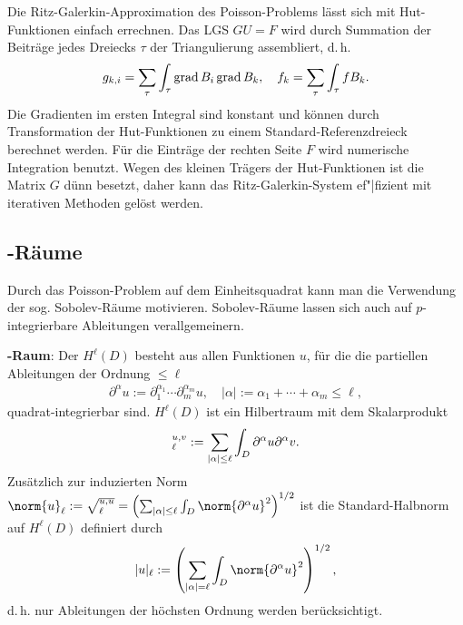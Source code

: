 \linie

Die Ritz-Galerkin-Approximation des Poisson-Problems lässt sich mit Hut-Funktionen einfach
errechnen.
Das LGS $GU = F$ wird durch Summation der Beiträge jedes Dreiecks $\tau$ der Triangulierung
assembliert, d.\,h.
\begin{align*}
    g_{k,i} = \sum_\tau \int_\tau \operatorname{grad} B_i \operatorname{grad} B_k,\quad
    f_k = \sum_\tau \int_\tau f B_k.
\end{align*}
Die Gradienten im ersten Integral sind konstant und können durch Transformation der Hut-Funktionen
zu einem Standard-Referenzdreieck berechnet werden.
Für die Einträge der rechten Seite $F$ wird numerische Integration benutzt.
Wegen des kleinen Trägers der Hut-Funktionen ist die Matrix $G$ dünn besetzt,
daher kann das Ritz-Galerkin-System ef"|fizient mit iterativen Methoden gelöst werden.

\pagebreak

\subsection{%
    -Räume%
}

Durch das Poisson-Problem auf dem Einheitsquadrat kann man die Verwendung der sog.
Sobolev-Räume motivieren.
Sobolev-Räume lassen sich auch auf $p$-integrierbare Ableitungen verallgemeinern.

\textbf{-Raum}:
Der  $H^\ell(D)$ besteht aus allen Funktionen $u$, für die die
partiellen Ableitungen der Ordnung $\le \ell$
\begin{align*}
    \partial^\alpha u := \partial_1^{\alpha_1} \dotsm \partial_m^{\alpha_m} u,\quad
    |\alpha| := \alpha_1 + \dotsb + \alpha_m \le \ell,
\end{align*}
quadrat-integrierbar sind.
$H^\ell(D)$ ist ein Hilbertraum mit dem Skalarprodukt
\begin{align*}
    \sp{u, v}_\ell := \sum_{|\alpha| \le \ell} \int_D \partial^\alpha u \partial^\alpha v.
\end{align*}
Zusätzlich zur induzierten Norm
$\norm{u}_\ell := \sqrt{\sp{u, u}_\ell} =
\left(\sum_{|\alpha| \le \ell} \int_D \norm{\partial^\alpha u}^2\right)^{1/2}$ ist die
Standard-Halbnorm auf $H^\ell(D)$ definiert durch
\begin{align*}
    |u|_\ell := \left(\sum_{|\alpha| = \ell} \int_D \norm{\partial^\alpha u}^2\right)^{1/2},
\end{align*}
d.\,h. nur Ableitungen der höchsten Ordnung werden berücksichtigt.


